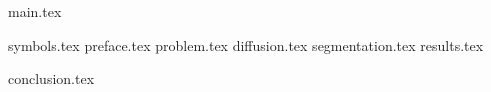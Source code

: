 

\usepackage{cmll}
\usepackage{lastpage}
\usepackage{pdfpages}
\usepackage{xassoccnt}

\usepackage{totcount}
\def\oldcite{}
\let\oldcite=\bibcite
\def\bibcite{\stepcounter{citenum}\oldcite}






\clearpage
{}
{main.tex}

\tableofcontents

\clearpage
{}
\pagestyle{fancy}
\setcounter{page}{9}

\clearpage

{symbols.tex}
{preface.tex}
{problem.tex}
{diffusion.tex}
{segmentation.tex}
{results.tex}

{conclusion.tex}

\clearpage
{}
{}
\renewcommand\bibname{Перелік джерел посилань}



